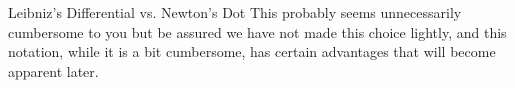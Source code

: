 \begin{mynotation}{Leibniz's Differential vs. Newton's Dot}
This probably seems unnecessarily cumbersome to you but be assured we
have not made this choice lightly, and this notation, while it is a
bit cumbersome, has certain advantages that will become apparent
later.
\end{mynotation}






